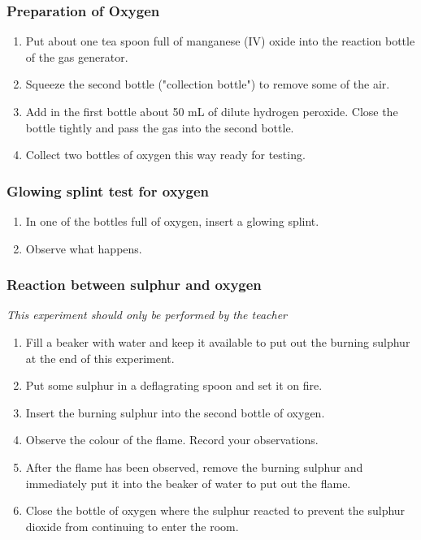 \subsubsection*{Preparation of Oxygen}
\begin{enumerate}
\item{Put about one tea spoon full of manganese (IV) oxide into the reaction bottle of the gas generator.}
\item{Squeeze the second bottle ("collection bottle") to remove some of the air.}
\item{Add in the first bottle about 50 mL of dilute hydrogen peroxide. Close the bottle tightly and pass the gas into the second bottle.}
\item{Collect two bottles of oxygen this way ready for testing.}
\end{enumerate}

\subsubsection*{Glowing splint test for oxygen}
\begin{enumerate}
\item{In one of the bottles full of oxygen, insert a glowing splint.}
\item{Observe what happens.}
\end{enumerate}

\subsubsection*{Reaction between sulphur and oxygen}
\textit{This experiment should only be performed by the teacher}
\begin{enumerate}
\item{Fill a beaker with water and keep it available to put out the burning sulphur at the end of this experiment.}
\item{Put some sulphur in a deflagrating spoon and set it on fire.}
\item{Insert the burning sulphur into the second bottle of oxygen.}
\item{Observe the colour of the flame. Record your observations.}
\item{After the flame has been observed, remove the burning sulphur and immediately put it into the beaker of water to put out the flame.}
\item{Close the bottle of oxygen where the sulphur reacted to prevent the sulphur dioxide from continuing to enter the room.}
\end{enumerate}

